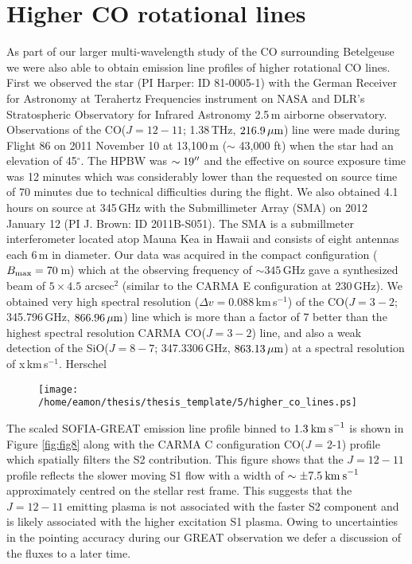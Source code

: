\section{Higher CO rotational lines}\label{sec:5.10}
As part of our larger multi-wavelength study of the CO surrounding Betelgeuse we were also able to obtain emission line profiles of higher rotational CO lines. First we observed the star (PI Harper: ID 81-0005-1) with the German Receiver for Astronomy at Terahertz Frequencies \cite[GREAT;][]{guesten_2000} instrument on NASA and DLR's Stratospheric Observatory for Infrared Astronomy \cite[SOFIA;][]{becklin_2009} 2.5\,m airborne observatory. Observations of the  CO($J = 12-11$; 1.38\,THz, $216.9\,\rm \mu m$) line were made during Flight 86 on 2011 November 10 at 13,100\,m ($\sim$ 43,000 ft) when the star had an elevation of 45$^{\circ}$. The HPBW was $\sim 19^{\prime\prime}$ and the effective on source exposure time was 12 minutes which was considerably lower than the requested on source time of 70 minutes due to technical difficulties during the flight. We also obtained 4.1 hours on source at 345\,GHz with the Submillimeter Array (SMA) on 2012 January 12 (PI J. Brown: ID 2011B-S051). The SMA is a submillmeter interferometer located  atop Mauna Kea in Hawaii and consists of eight antennas each 6\,m in diameter. Our data was acquired in the compact configuration ($B_{\rm{max}}=70$\,m) which at the observing frequency of $\sim 345$\,GHz gave a synthesized beam of $5\times 4.5$ arcsec$^2$ (similar to the CARMA E configuration at 230\,GHz). We obtained very high spectral resolution ($\Delta v= 0.088$\,km\,s$^{-1}$) of the CO($J = 3-2$; 345.796\,GHz, $866.96\,\rm \mu m$) line which is more than a factor of 7 better than the highest spectral resolution CARMA CO($J = 3-2$) line, and also a weak detection of the SiO($J = 8-7$; 347.3306\,GHz, $863.13\,\rm \mu m$) at a spectral resolution of x\,km\,s$^{-1}$. 
Herschel



\begin{figure}[!ht]
\centering 
\texttt{[image: /home/eamon/thesis/thesis\_template/5/higher\_co\_lines.ps]}
\caption[]{}
\label{fig:5.12}
\end{figure}

The scaled SOFIA-GREAT emission line profile binned to $1.3\>{\rm km\>s}^{-1}$ is shown in Figure \ref{fig:fig8} along with the CARMA C configuration CO(\textit{J} = 2-1) profile which spatially filters the S2 contribution. This figure shows that the $\textit{J} = 12-11$ profile reflects the slower moving S1 flow with a width of $\sim \pm 7.5\>{\rm km\>s}^{-1}$ approximately centred on the stellar rest frame. This suggests that the $\textit{J} = 12-11$ emitting plasma is not associated with the faster S2 component and is likely associated with the higher excitation S1 plasma. Owing to uncertainties in the pointing accuracy during our GREAT observation we defer a discussion of the fluxes to a later time.

